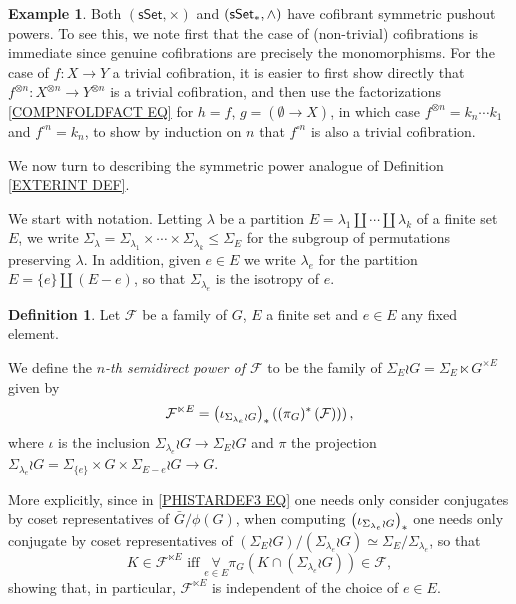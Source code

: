 \documentclass[a4paper,10pt
,draft
]{article}%
\numberwithin{equation}{section}
\numberwithin{figure}{section}
\theoremstyle{definition} %
\newtheorem{definition}[equation]{Definition}%
\newtheorem{example}[equation]{Example}%
\newcommand{\sSet}{\ensuremath{\mathsf{sSet}}}%
\newcommand{\1}{\ensuremath{\mathbbm 1}}%
\begin{document}
\begin{example}
      \label{SSET_CSPP_EX}
	Both $(\mathsf{sSet},\times)$ and 
	$(\mathsf{sSet}_{\**},\wedge)$ have cofibrant symmetric pushout powers.
        To see this, we note first that the case of (non-trivial) cofibrations is immediate since
        genuine cofibrations 
        are precisely the monomorphisms. 
	For the case of $f \colon X \to Y$ a trivial cofibration, it is easier to first show directly that 
	$f^{\otimes n} \colon X^{\otimes n} \to Y^{\otimes n}$
	is a trivial cofibration, 
	and then use the factorizations
	\eqref{COMPNFOLDFACT EQ}
	for $h=f$, $g=(\emptyset \to X)$, 
	in which case $f^{\otimes n} = k_n\cdots k_1$ and 
	$f^{\square n} = k_n$,
	to show by induction on $n$ that 
	$f^{\square n}$ is also a trivial cofibration.
\end{example}


We now turn to describing the symmetric power analogue of 
Definition \ref{EXTERINT DEF}.

We start with notation. Letting 
$\lambda$ be a partition 
$E = \lambda_1 \amalg\cdots \amalg \lambda_k$
of a finite set $E$, 
we write 
 $\Sigma_{\lambda} = \Sigma_{\lambda_1} \times \cdots \times
 \Sigma_{\lambda_k} \leq \Sigma_E$ for the subgroup of permutations preserving $\lambda$. 
 In addition, given $e \in E$ we write
$\lambda_e$ for the partition $E = \{e\} \amalg (E-e)$, so that $\Sigma_{\lambda_e}$ is the isotropy of $e$.


\begin{definition}\label{FLTIMESN DEF}
 Let $\mathcal{F}$ be a family of $G$,
 $E$ a finite set and $e \in E$ any fixed element.
 
We define the \textit{$n$-th semidirect power of $\mathcal{F}$} to be the family of $\Sigma_E \wr G = \Sigma_E \ltimes G^{\times E}$ given by
\[
	\mathcal{F}^{\ltimes E}
		=
	\left(
	\iota_{\Sigma_{\lambda_e} \wr G}
	\right)_{\**}
	\left(
		\left(
		\pi_{G})^{\**}\left(\mathcal{F}\right)
		\right)
	\right),
\]
where $\iota$ is the inclusion 
$\Sigma_{\lambda_e} \wr G
	\to 
\Sigma_E \wr G$
and $\pi$ the projection
$\Sigma_{\lambda_e} \wr G = \Sigma_{\{e\}} \times G \times \Sigma_{E-e} \wr G
\to G$.

More explicitly, since in \eqref{PHISTARDEF3 EQ} one needs only consider conjugates by coset representatives of $\bar{G}/\phi(G)$, when computing 
$\left( \iota_{\Sigma_{\lambda_e} \wr G}\right)_{\**}$
one needs only conjugate by coset representatives of 
$\left(\Sigma_E \wr G\right)/
\left(\Sigma_{\lambda_e} \wr G\right)
\simeq \Sigma_E/\Sigma_{\lambda_e}$, so that
\begin{equation}\label{FLTIMESN2 EQ}
	K \in \mathcal{F}^{\ltimes E} 
	\text{ iff }
	\underset{e \in E}{\forall} \pi_{G}
	\left(
		K \cap \left( \Sigma_{\lambda_e} \wr G \right)
	\right)
	\in \mathcal{F},
\end{equation}
showing that, in particular, $\mathcal{F}^{\ltimes E}$
is independent of the choice of $e \in E$.
\end{definition}
\end{document}
